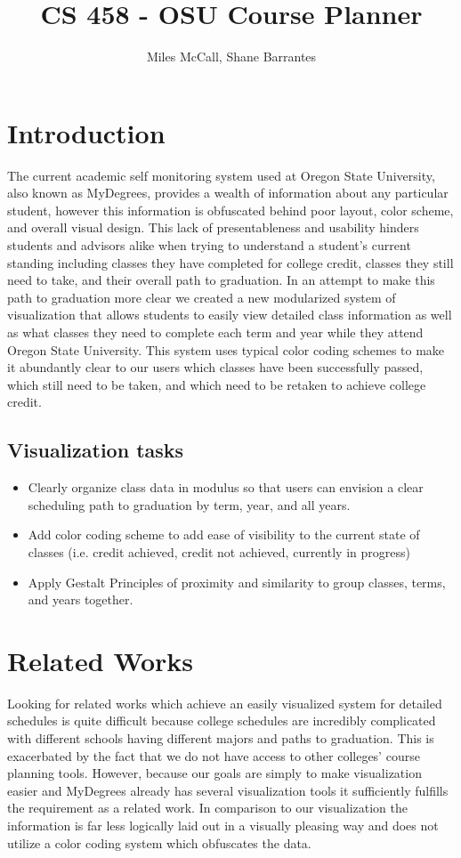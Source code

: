 \documentclass[journal]{vgtc}
\title{CS 458 - OSU Course Planner}
\author{Miles McCall, Shane Barrantes}
\begin{document}
\maketitle
\tableofcontents

\section{Introduction}
The current academic self monitoring system used at Oregon State University, also known as MyDegrees, provides a wealth of information about any particular student, however this information is obfuscated behind poor layout, color scheme, and overall visual design. This lack of presentableness and usability hinders students and advisors alike when trying to understand a student's current standing including classes they have completed for college credit, classes they still need to take, and their overall path to graduation. In an attempt to make this path to graduation more clear we created a new modularized system of visualization that allows students to easily view detailed class information as well as what classes they need to complete each term and year while they attend Oregon State University. This system uses typical color coding schemes to make it abundantly clear to our users which classes have been successfully passed, which still need to be taken, and which need to be retaken to achieve college credit.

\subsection{Visualization tasks}
  \begin{itemize}
    \item Clearly organize class data in modulus so that users can envision a clear scheduling path to graduation by term, year, and all years. 
    \item Add color coding scheme to add ease of visibility to the current state of classes (i.e. credit achieved, credit not achieved, currently in progress)
    \item Apply Gestalt Principles of proximity and similarity to group classes, terms, and years together.
   \end{itemize}
   
\section{Related Works}
Looking for related works which achieve an easily visualized system for detailed schedules is quite difficult because college schedules are incredibly complicated with different schools having different majors and paths to graduation. This is exacerbated by the fact that we do not have access to other colleges' course planning tools. However, because our goals are simply to make visualization easier and MyDegrees already has several visualization tools it sufficiently fulfills the requirement as a related work. In comparison to our visualization the information is far less logically laid out in a visually pleasing way and does not utilize a color coding system which obfuscates the data. 
\end{document}

